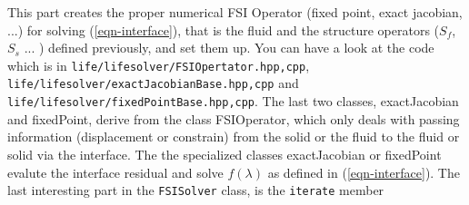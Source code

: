 This part  creates the proper numerical FSI Operator (fixed point, exact jacobian, ...)
for solving (\ref{eqn-interface}), that is the fluid and the structure operators ($S_f$, $S_s$ ... )
defined previously, and set them up. You can have a look at the code which is in \verb!life/lifesolver/FSIOpertator.hpp,cpp!,
\verb!life/lifesolver/exactJacobianBase.hpp,cpp! and \verb!life/lifesolver/fixedPointBase.hpp,cpp!.
The last two classes, exactJacobian and fixedPoint, derive from the class FSIOperator, which only
deals with passing information (displacement or constrain) from the solid or the fluid to the fluid or solid via
the interface. The the specialized classes exactJacobian or fixedPoint evalute the interface residual
and solve $f(\lambda)$ as defined in (\ref{eqn-interface}).
The last interesting part in the \verb!FSISolver! class, is the \verb!iterate! member
